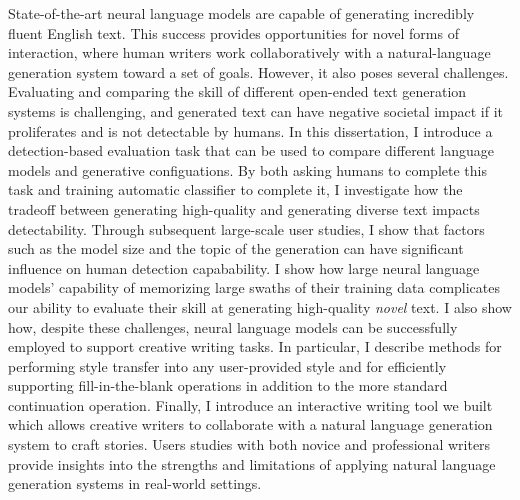 \begin{center}
{\Large \mytitle}

\vspace{2cm}

{\Large{}}
\end{center}

State-of-the-art neural language models are capable of generating incredibly fluent English text.
This success provides opportunities for novel forms of interaction, where human writers work collaboratively with a natural-language generation system toward a set of goals.
However, it also poses several challenges.
Evaluating and comparing the skill of different open-ended text generation systems is challenging, and generated text can have negative societal impact if it proliferates and is not detectable by humans.
In this dissertation, I introduce a detection-based evaluation task that can be used to compare different language models and generative configuations.
By both asking humans to complete this task and training automatic classifier to complete it, I investigate how the tradeoff between generating high-quality and generating diverse text impacts detectability.
Through subsequent large-scale user studies, I show that factors such as the model size and the topic of the generation can have significant influence on human detection capabability.
I show how large neural language models' capability of memorizing large swaths of their training data complicates our ability to evaluate their skill at generating high-quality \textit{novel} text.
I also show how, despite these challenges, neural language models can be successfully employed to support creative writing tasks.
In particular, I describe methods for performing style transfer into any user-provided style and for efficiently supporting fill-in-the-blank operations in addition to the more standard continuation operation.
Finally, I introduce an interactive writing tool we built which allows creative writers to collaborate with a natural language generation system to craft stories.
Users studies with both novice and professional writers provide insights into the strengths and limitations of applying natural language generation systems in real-world settings.